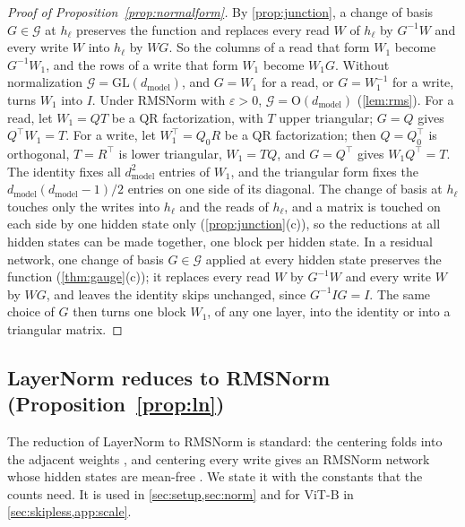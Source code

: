 \documentclass[10pt]{article}
\theoremstyle{definition}
\theoremstyle{remark}
\newcommand{\dm}{d_{\mathrm{model}}}
\newcommand{\GL}{\mathrm{GL}}
\newcommand{\Ort}{\mathrm{O}}
\newcommand{\G}{\mathcal{G}}
\begin{document}
\begin{proof}[Proof of Proposition~\ref{prop:normalform}]
By \cref{prop:junction}, a change of basis $G \in \G$ at $h_\ell$ preserves the function and replaces every read $W$ of $h_\ell$ by $G^{-1}W$ and every write $W$ into $h_\ell$ by $WG$. So the columns of a read that form $W_1$ become $G^{-1}W_1$, and the rows of a write that form $W_1$ become $W_1G$. Without normalization $\G = \GL(\dm)$, and $G = W_1$ for a read, or $G = W_1^{-1}$ for a write, turns $W_1$ into $I$. Under RMSNorm with $\varepsilon > 0$, $\G = \Ort(\dm)$ (\cref{lem:rms}). For a read, let $W_1 = QT$ be a QR factorization, with $T$ upper triangular; $G = Q$ gives $Q^\top W_1 = T$. For a write, let $W_1^\top = Q_0R$ be a QR factorization; then $Q = Q_0^\top$ is orthogonal, $T = R^\top$ is lower triangular, $W_1 = TQ$, and $G = Q^\top$ gives $W_1Q^\top = T$. The identity fixes all $\dm^2$ entries of $W_1$, and the triangular form fixes the $\dm(\dm-1)/2$ entries on one side of its diagonal. The change of basis at $h_\ell$ touches only the writes into $h_\ell$ and the reads of $h_\ell$, and a matrix is touched on each side by one hidden state only (\cref{prop:junction}(c)), so the reductions at all hidden states can be made together, one block per hidden state. In a residual network, one change of basis $G \in \G$ applied at every hidden state preserves the function (\cref{thm:gauge}(c)); it replaces every read $W$ by $G^{-1}W$ and every write $W$ by $WG$, and leaves the identity skips unchanged, since $G^{-1}IG = I$. The same choice of $G$ then turns one block $W_1$, of any one layer, into the identity or into a triangular matrix.
\end{proof}

\subsection{LayerNorm reduces to RMSNorm\texorpdfstring{ (Proposition~\ref*{prop:ln})}{}}\label{app:ln}

The reduction of LayerNorm to RMSNorm is standard: the centering folds into the adjacent weights \citep{elhage2021circuits}, and centering every write gives an RMSNorm network whose hidden states are mean-free \citep{ashkboos2024slicegpt,theus2025glmc}. We state it with the constants that the counts need. It is used in \cref{sec:setup,sec:norm} and for ViT-B in \cref{sec:skipless,app:scale}.
\end{document}
